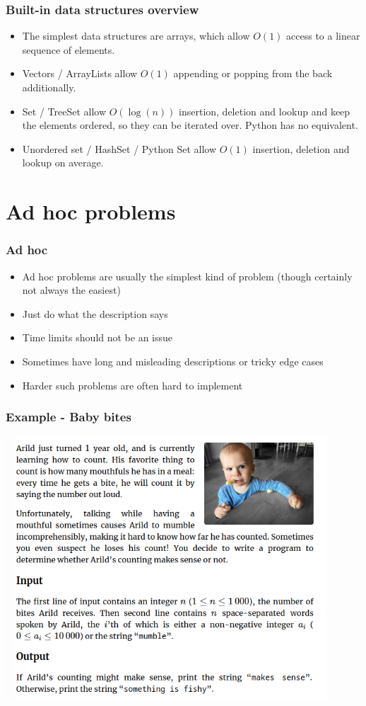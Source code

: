 \documentclass{beamer}
\begin{document}
\begin{frame}[plain]
    \frametitle{Built-in data structures overview}
    \scriptsize
    \begin{itemize}
        \item The simplest data structures are arrays, which allow $O(1)$ access to a linear sequence of elements.
        \item Vectors / ArrayLists allow $O(1)$ appending or popping from the back additionally.
        \item Set / TreeSet allow $O(\log(n))$ insertion, deletion and lookup and keep the elements ordered, so they can be iterated over. Python has no equivalent.
        \item Unordered set / HashSet / Python Set allow $O(1)$ insertion, deletion and lookup on average.
    \end{itemize}
\end{frame}


\section*{Ad hoc problems}

\begin{frame}[plain]
    \frametitle{Ad hoc}
    \begin{itemize}
        \item Ad hoc problems are usually the simplest kind of problem (though certainly not always the easiest)
        \item Just do what the description says
        \item Time limits should not be an issue
        \item Sometimes have long and misleading descriptions or tricky edge cases
        \item Harder such problems are often hard to implement
    \end{itemize}
\end{frame}

\begin{frame}[plain]
    \frametitle{Example - Baby bites}
    \begin{center}
    		\includegraphics[width=0.9\textwidth]{babybites}
    	\end{center}
\end{frame}
\end{document}
